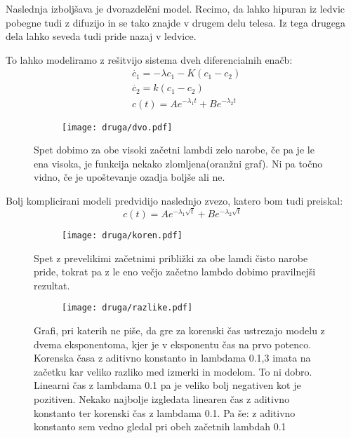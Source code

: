\documentclass{article}
\begin{document}
Naslednja izboljšava je dvorazdelčni model. Recimo, da lahko hipuran iz ledvic pobegne tudi z difuzijo in se tako znajde v drugem delu telesa. Iz tega drugega dela lahko seveda tudi pride nazaj v ledvice.

To lahko modeliramo z rešitvijo sistema dveh diferencialnih enačb: 
\begin{align*}
&\dot{c_1} = -\lambda c_1 - K(c_1 - c_2) \\
&\dot{c_2} = k(c_1-c_2) \\
&c(t) = A e^{-\lambda_1 t} + B e^{-\lambda_2 t}
\end{align*}

\begin{figure}[H]
\centering
\begin{subfigure}{.8\textwidth}
\texttt{[image: druga/dvo.pdf]}
\end{subfigure}
\caption*{Spet dobimo za obe visoki začetni lambdi zelo narobe, če pa je le ena visoka, je funkcija nekako zlomljena(oranžni graf). Ni pa točno vidno, če je upoštevanje ozadja boljše ali ne.}
\end{figure}

Bolj komplicirani modeli predvidijo naslednjo zvezo, katero bom tudi preiskal:
\begin{equation*}
c(t) = A e^{-\lambda_1 \sqrt{t}} + B e^{-\lambda_2 \sqrt{t}}
\end{equation*}

\begin{figure}[H]
\centering
\begin{subfigure}{.8\textwidth}
\texttt{[image: druga/koren.pdf]}
\end{subfigure}
\caption*{Spet z prevelikimi začetnimi približki za obe lamdi čisto narobe pride, tokrat pa z le eno večjo začetno lambdo dobimo pravilnejši rezultat.}
\end{figure}

\begin{figure}[H]
\centering
\begin{subfigure}{.8\textwidth}
\texttt{[image: druga/razlike.pdf]}
\end{subfigure}
\caption*{Grafi, pri katerih ne piše, da gre za korenski čas ustrezajo modelu z dvema eksponentoma, kjer je v eksponentu čas na prvo potenco. Korenska časa z aditivno konstanto in lambdama 0.1,3 imata na začetku kar veliko razliko med izmerki in modelom. To ni dobro. Linearni čas z lambdama 0.1 pa je veliko bolj negativen kot je pozitiven. Nekako najbolje izgledata linearen čas z aditivno konstanto ter korenski čas z lambdama 0.1. Pa še: z aditivno konstanto sem vedno gledal pri obeh začetnih lambdah 0.1}
\end{figure}
\end{document}
